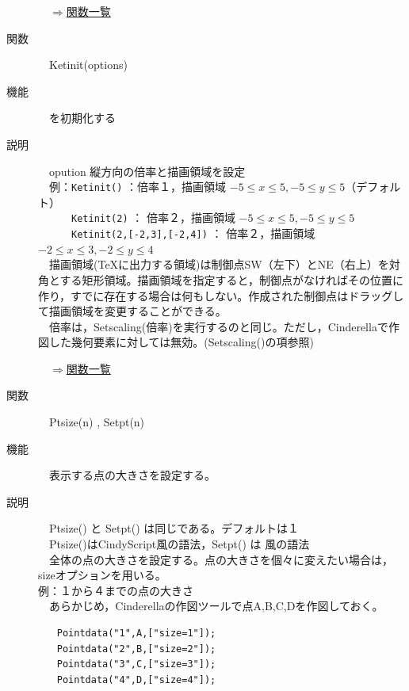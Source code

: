 \documentclass[papersize,a4paper,12pt,uplatex]{jsarticle}
\begin{document}
\begin{description}
\begin{flushright}　\hyperlink{functionlist}{$\Rightarrow$関数一覧}\end{flushright}
\newpage
\hypertarget{ketinit}{}
\item[関数]　Ketinit(options)
\item[機能]　\ketcindy を初期化する
\item[説明]　opution 縦方向の倍率と描画領域を設定\\

　例：\verb|Ketinit()|   ：倍率１，描画領域 $-5 \leq x \leq 5 , -5 \leq y \leq 5$（デフォルト）\\
　　　\verb|Ketinit(2)| ： 倍率２，描画領域 $-5 \leq x \leq 5 , -5 \leq y \leq 5$\\
　　　\verb|Ketinit(2,[-2,3],[-2,4])| ： 倍率２，描画領域 $-2 \leq x \leq 3 , -2 \leq y \leq 4$\\

　描画領域(TeXに出力する領域)は制御点SW（左下）とNE（右上）を対角とする矩形領域。描画領域を指定すると，制御点がなければその位置に作り，すでに存在する場合は何もしない。作成された制御点はドラッグして描画領域を変更することができる。\\
　倍率は，Setscaling(倍率)を実行するのと同じ。ただし，Cinderellaで作図した幾何要素に対しては無効。(Setscaling()の項参照)\\

\begin{flushright}　\hyperlink{functionlist}{$\Rightarrow$関数一覧}\end{flushright}

\hypertarget{ptsie}{}
\item[関数]　Ptsize(n) , Setpt(n)
\item[機能]　表示する点の大きさを設定する。
\item[説明]　Ptsize() と Setpt() は同じである。デフォルトは１\\
　Ptsize()はCindyScript風の語法，Setpt() は \ketpic 風の語法\\
　全体の点の大きさを設定する。点の大きさを個々に変えたい場合は，sizeオプションを用いる。\\

例：１から４までの点の大きさ\\
　あらかじめ，Cinderellaの作図ツールで点A,B,C,Dを作図しておく。
\begin{verbatim}
　　Pointdata("1",A,["size=1"]);
　　Pointdata("2",B,["size=2"]);
　　Pointdata("3",C,["size=3"]);
　　Pointdata("4",D,["size=4"]);
\end{verbatim}


\end{description}
\end{document}
